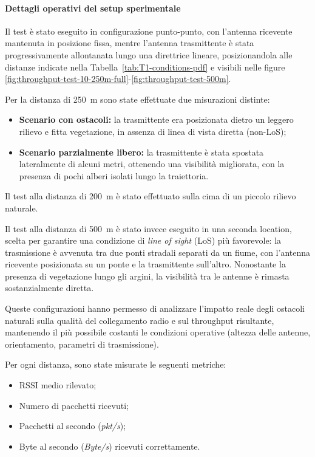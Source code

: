 \documentclass[12pt,a4paper,twoside]{book}
\begin{document}
\paragraph{Dettagli operativi del setup sperimentale}

Il test è stato eseguito in configurazione punto-punto, con l'antenna ricevente
mantenuta in posizione fissa, mentre l'antenna trasmittente
è stata progressivamente allontanata lungo una direttrice lineare, posizionandola
alle distanze indicate nella Tabella~\ref{tab:T1-conditions-pdf} e visibili nelle figure
\ref{fig:throughput-test-10-250m-full}-\ref{fig:throughput-test-500m}.

Per la distanza di 250~m sono state effettuate due misurazioni distinte:
\begin{itemize}
    \item \textbf{Scenario con ostacoli:} la trasmittente era posizionata dietro
          un leggero rilievo e fitta vegetazione, in assenza di linea di vista diretta (non-LoS);

    \item \textbf{Scenario parzialmente libero:} la trasmittente è stata spostata
          lateralmente di alcuni metri, ottenendo una visibilità migliorata, con la presenza
          di pochi alberi isolati lungo la traiettoria.
\end{itemize}

Il test alla distanza di 200~m è stato effettuato sulla cima di un piccolo rilievo naturale.

Il test alla distanza di 500~m è stato invece eseguito in una seconda location,
scelta per garantire una condizione di \emph{line of sight} (LoS) più favorevole:
la trasmissione è avvenuta tra due ponti stradali separati da un fiume, con l’antenna
ricevente posizionata su un ponte e la trasmittente sull'altro. Nonostante la presenza
di vegetazione lungo gli argini, la visibilità tra le antenne è rimasta sostanzialmente diretta.

Queste configurazioni hanno permesso di analizzare l'impatto reale degli ostacoli naturali
sulla qualità del collegamento radio e sul throughput risultante, mantenendo il
più possibile costanti le condizioni operative (altezza delle antenne, orientamento,
parametri di trasmissione).

Per ogni distanza, sono state misurate le seguenti metriche:
\begin{itemize}
    \item \ac{RSSI} medio rilevato;
    \item Numero di pacchetti ricevuti;
    \item Pacchetti al secondo (\emph{pkt/s});
    \item Byte al secondo (\emph{Byte/s}) ricevuti correttamente.
\end{itemize}
\end{document}
